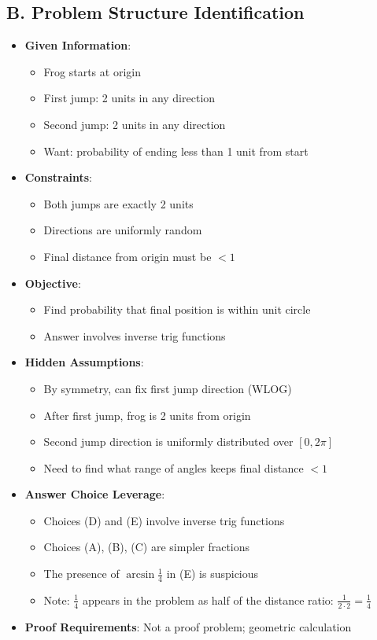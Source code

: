 \documentclass[12pt]{article}
\begin{document}
\begin{problemconfigbox}
\subsection*{B. Problem Structure Identification}
\begin{itemize}[leftmargin=*]
    \item \textbf{Given Information}: 
    \begin{itemize}
        \item Frog starts at origin
        \item First jump: 2 units in any direction
        \item Second jump: 2 units in any direction
        \item Want: probability of ending less than 1 unit from start
    \end{itemize}
    \item \textbf{Constraints}: 
    \begin{itemize}
        \item Both jumps are exactly 2 units
        \item Directions are uniformly random
        \item Final distance from origin must be $< 1$
    \end{itemize}
    \item \textbf{Objective}: 
    \begin{itemize}
        \item Find probability that final position is within unit circle
        \item Answer involves inverse trig functions
    \end{itemize}
    \item \textbf{Hidden Assumptions}: 
    \begin{itemize}
        \item By symmetry, can fix first jump direction (WLOG)
        \item After first jump, frog is 2 units from origin
        \item Second jump direction is uniformly distributed over $[0, 2\pi]$
        \item Need to find what range of angles keeps final distance $< 1$
    \end{itemize}
    \item \textbf{Answer Choice Leverage}: 
    \begin{itemize}
        \item Choices (D) and (E) involve inverse trig functions
        \item Choices (A), (B), (C) are simpler fractions
        \item The presence of $\arcsin \frac{1}{4}$ in (E) is suspicious
        \item Note: $\frac{1}{4}$ appears in the problem as half of the distance ratio: $\frac{1}{2 \cdot 2} = \frac{1}{4}$
    \end{itemize}
    \item \textbf{Proof Requirements}: Not a proof problem; geometric calculation
\end{itemize}


\end{problemconfigbox}
\end{document}
